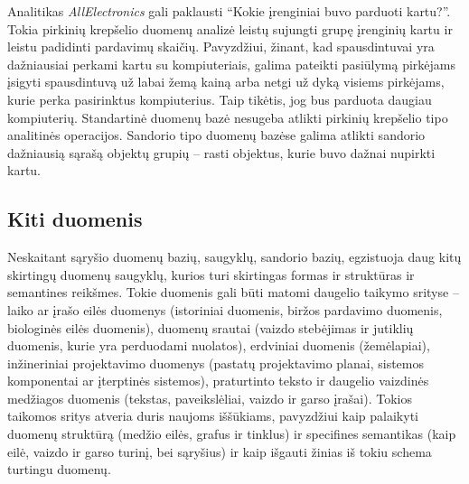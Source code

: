 Analitikas \textit{AllElectronics} gali paklausti ``Kokie įrenginiai buvo parduoti kartu?''.
Tokia pirkinių krepšelio duomenų analizė leistų sujungti grupę įrenginių kartu ir leistu padidinti pardavimų skaičių.
Pavyzdžiui, žinant, kad spausdintuvai yra dažniausiai perkami kartu su kompiuteriais, galima pateikti pasiūlymą pirkėjams įsigyti spausdintuvą už labai žemą kainą arba netgi už dyką visiems pirkėjams, kurie perka pasirinktus kompiuterius. Taip tikėtis, jog bus parduota daugiau kompiuterių.
Standartinė duomenų bazė nesugeba atlikti pirkinių krepšelio tipo analitinės operacijos.
Sandorio tipo duomenų bazėse galima atlikti sandorio dažniausią sąrašą objektų grupių -- rasti objektus, kurie buvo dažnai nupirkti kartu.

\subsection{Kiti duomenis}

Neskaitant sąryšio duomenų bazių, saugyklų, sandorio bazių, egzistuoja daug kitų skirtingų duomenų saugyklų, kurios turi skirtingas formas ir struktūras ir semantines reikšmes.
Tokie duomenis gali būti matomi daugelio taikymo srityse -- laiko ar įrašo eilės duomenys (istoriniai duomenis, biržos pardavimo duomenis, biologinės eilės duomenis), duomenų srautai (vaizdo stebėjimas ir jutiklių duomenis, kurie yra perduodami nuolatos), erdviniai duomenis (žemėlapiai), inžineriniai projektavimo duomenys (pastatų projektavimo planai, sistemos komponentai ar įterptinės sistemos), praturtinto teksto ir daugelio vaizdinės medžiagos duomenis (tekstas, paveikslėliai, vaizdo ir garso įrašai).
Tokios taikomos sritys atveria duris naujoms iššūkiams, pavyzdžiui kaip palaikyti duomenų struktūrą (medžio eilės, grafus ir tinklus) ir specifines semantikas (kaip eilė, vaizdo ir garso turinį, bei sąryšius) ir kaip išgauti žinias iš tokiu schema turtingu duomenų.

